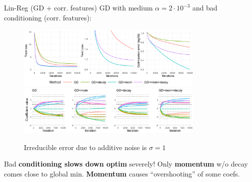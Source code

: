\documentclass[11pt,compress,t,notes=noshow, xcolor=table]{beamer}
\begin{document}
\begin{vbframe}{Lin-Reg (GD + corr. features)}
\vspace{-0.4cm}
GD with medium $\alpha=2\cdot10^{-3}$ and bad conditioning (corr. features):
\begin{figure}
            \includegraphics[width=0.8\textwidth]{slides/04-multivariate-first-order/figure_man/simu_linmod/GD_reg_med_lr_corr_iters.pdf} \\
             \includegraphics[width=0.8\textwidth]{slides/04-multivariate-first-order/figure_man/simu_linmod/GD_reg_coef_med_corr.pdf}\\
            \begin{footnotesize}
                Irreducible error due to additive noise is $\sigma=1$
            \end{footnotesize}
\end{figure}
{\footnotesize
Bad \textbf{conditioning slows down optim} severely! Only \textbf{momentum} w/o decay comes close to global min. \textbf{Momentum} causes ``overshooting'' of some coefs.}
\end{vbframe}
\end{document}
